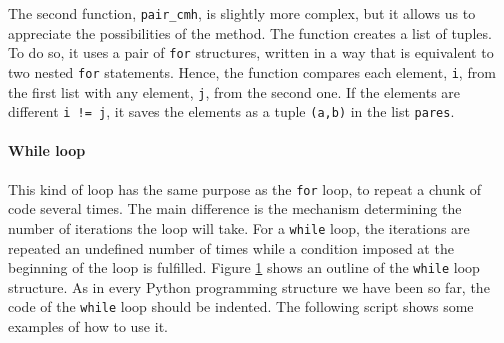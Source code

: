 \begin{paracol}{2}
The second function, \texttt{pair_cmh}, is slightly more complex, but it allows us to appreciate the possibilities of the method. The function creates a list of tuples. To do so, it uses a pair of  \texttt{for} structures, written in a way that is equivalent to two nested \texttt{for} statements. Hence, the function compares each element, \texttt{i}, from the first list with any element, \texttt{j}, from the second one. If the elements are different \texttt{i != j}, it saves the elements as a tuple \texttt{(a,b)} in the list \texttt{pares}. 

\paragraph{While loop} This kind of loop has the same purpose as the \texttt{for} loop, to repeat a chunk of code several times. The main difference is the mechanism determining the number of iterations the loop will take. For a \texttt{while} loop, the iterations are repeated an undefined number of times while a condition imposed at the beginning of the loop is fulfilled. Figure \ref{fig:while} shows an outline of the \texttt{while} loop structure. As in every Python programming structure we have been so far, the code of the \texttt{while} loop should be indented. The following script shows some examples of how to use it.   

\end{paracol}

\begin{figure}
\centering
{}
\label{fig:while}
\end{figure}

